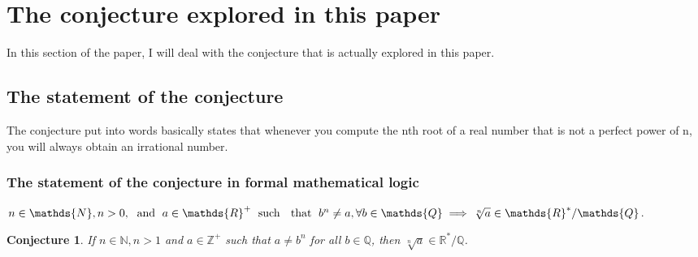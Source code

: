 \documentclass{turabian-researchpaper}
\newtheorem*{conjecture*}{Conjecture}
\begin{document}
\section{The conjecture explored in this paper} 
In this section of the paper, I will deal with the conjecture that is actually explored in this paper.  
\subsection{The statement of the conjecture}   
The conjecture put into words basically states that whenever you compute the nth root of a real number that is not a perfect power of n, you will always obtain an irrational number. 

\subsubsection{The statement of the conjecture in formal mathematical logic} 
\(n \in \mathds{N}, n > 0, \text{\hspace{0.1cm} and \hspace{0.1cm}} a \in \mathds{R}^{+} \text{\hspace{0.1cm} such \hspace{0.1cm} that \hspace{0.1cm}} b^{n} \neq a, \forall b \in \mathds{Q} \implies \sqrt[n]{a} \in \mathds{R}^{*}/\mathds{Q}\).  

\begin{conjecture*}
  If \(n \in \mathds{N}, n > 1\) and \(a \in \mathds{Z}^{+}\) such that \(a \neq  b^n\) for all \(b \in \mathds{Q}\), then \(\sqrt[n]{a} \in \mathds{R}^{*}/\mathds{Q}\). 
\end{conjecture*} 
\end{document}
